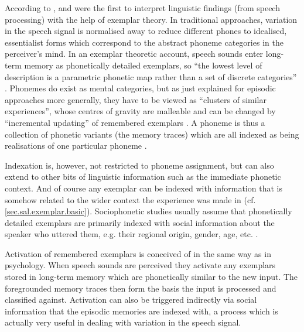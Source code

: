 According to \textcite[cf.][517]{pierrehumbert2006}, \textcite{goldinger1996} and \textcite{johnson1997} were the first to interpret linguistic findings (from speech processing) with the help of exemplar theory.
In traditional approaches, variation in the speech signal is normalised away to reduce different phones to idealised, essentialist forms which correspond to the abstract phoneme categories in the perceiver's mind.
In an exemplar theoretic account, speech sounds enter long-term memory as phonetically detailed exemplars, so ``the lowest level of description is a parametric phonetic map rather than a set of discrete categories'' \parencite[519]{pierrehumbert2006}.
Phonemes do exist as mental categories, but as just explained for episodic approaches more generally, they have to be viewed as ``clusters of similar experiences'', whose centres of gravity are malleable and can be changed by ``incremental updating'' of remembered exemplars \parencite[cf.][519]{pierrehumbert2006}.
A phoneme is thus a collection of phonetic variants (the memory traces) which are all indexed as being realisations of one particular phoneme \parencite[cf.][113]{pierrehumbert2002}.

Indexation is, however, not restricted to phoneme assignment, but can also extend to other bits of linguistic information such as the immediate phonetic context.
And of course any exemplar can be indexed with information that is somehow related to the wider context the experience was made in (cf. \ref{sec.sal.exemplar.basic}).
Sociophonetic studies usually assume that phonetically detailed exemplars are primarily indexed with social information about the speaker who uttered them, e.g. their regional origin, gender, age, etc. \parencite[cf.][370]{hayetal2006a}.

Activation of remembered exemplars is conceived of in the same way as in psychology.
When speech sounds are perceived they activate any exemplars stored in long-term memory which are phonetically similar to the new input.
The foregrounded memory traces then form the basis the input is processed and classified against.
Activation can also be triggered indirectly via social information that the episodic memories are indexed with, a process which is actually very useful in dealing with variation in the speech signal.


